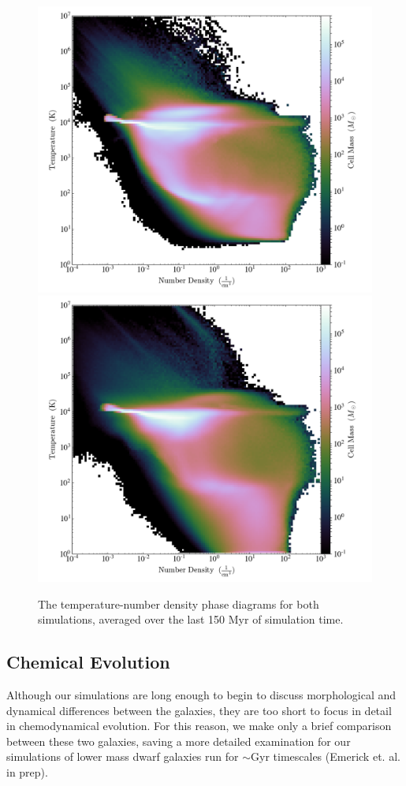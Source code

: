 \documentclass[twocolumn]{aastex61}
\begin{document}
\begin{figure}
\includegraphics[width=0.45\linewidth]{sndriving_phase.png}
\includegraphics[width=0.45\linewidth]{shortrad_phase.png}
\caption{The temperature-number density phase diagrams for both simulations, averaged over the last 150 Myr of simulation time.}
\label{fig:phase}
\end{figure}

\subsection{Chemical Evolution} %
\label{sec:chemical evolution}
Although our simulations are long enough to begin to discuss morphological and dynamical differences between the galaxies, they are too short to focus in detail in chemodynamical evolution. For this reason, we make only a brief comparison between these two galaxies, saving a more detailed examination for our simulations of lower mass dwarf galaxies run for $\sim$Gyr timescales (Emerick et. al. in prep).
\end{document}
